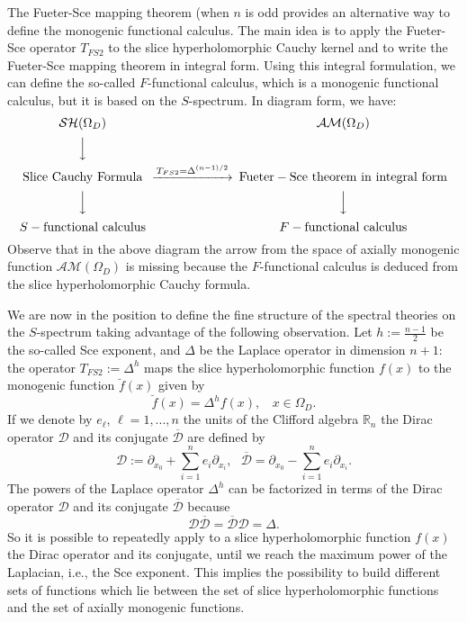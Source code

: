\documentclass[reqno,11pt]{amsart}
\numberwithin{equation}{section}
\theoremstyle{definition}
\begin{document}
\medskip
The Fueter-Sce mapping theorem (when $n$ is odd provides an
alternative way to define the monogenic functional calculus.
The main idea is to apply the Fueter-Sce operator $T_{FS2}$ to the slice hyperholomorphic Cauchy kernel and to write the Fueter-Sce mapping theorem in integral form. Using this integral formulation, we can define the so-called $F$-functional calculus, which
 is a monogenic functional calculus, but it is based on the $S$-spectrum.
In diagram form, we have:
\begin{equation*}
\begin{CD}
{\mathcal{SH}(\Omega_D)} @.  {\mathcal{AM}(\Omega_D)} \\   @V  VV
  @.
\\
{{\rm  Slice\ Cauchy \ Formula}}  @> T_{FS2}=\Delta^{(n-1)/2}>> {{\rm Fueter-Sce\ theorem \ in \  integral\  form}}
\\
@V VV    @V VV
\\
{S-{\rm  functional \ calculus}} @. F-{{\rm functional \ calculus}}
\end{CD}
\end{equation*}
 Observe that in the above diagram the arrow from the space of axially monogenic function $\mathcal{AM}(\Omega_D)$ is missing because the $F$-functional calculus is deduced from the slice hyperholomorphic Cauchy formula.


\medskip
We are now in the position to define the fine structure of the spectral theories on the $S$-spectrum
taking advantage of the following observation.
Let $h:=\frac{n-1}{2}$ be the so-called Sce exponent, and $\Delta$ be the Laplace operator in dimension $n+1$: the operator $T_{FS2}:= \Delta^{h}$  maps the slice hyperholomorphic function $f(x)$ to the monogenic function $\breve{f}(x)$ given by
$$
\breve{f}(x)= \Delta^hf(x),\ \ \ \ x\in \Omega_D.
$$
If we denote by $e_\ell$, $\ell=1,...,n$ the units of the Clifford algebra $\mathbb{R}_n$
the Dirac operator $\mathcal{D}$ and its conjugate $\overline{\mathcal{D}}$ are defined by
$$
\mathcal{D} :=\partial_{x_0} +\sum_{i=1}^n e_i
\partial_{x_i}, \ \ \ \overline{\mathcal{D}}=\partial_{x_0} -\sum_{i=1}^n e_i
\partial_{x_i}.
$$
The powers of the Laplace operator $\Delta^h$ can be factorized in terms of the
Dirac operator $ \mathcal{D}$ and its conjugate
 $\mathcal{\overline{D}}$ because
   $$
   \mathcal{D}\mathcal{\overline{D}}=\mathcal{\overline{D}}\mathcal{D}=\Delta.
   $$
   So it is possible to repeatedly apply to a slice hyperholomorphic function $f(x)$
   the Dirac operator and its conjugate, until we reach the maximum power of the Laplacian, i.e., the Sce exponent.
 This implies the possibility to build different sets of functions which lie between the set of slice hyperholomorphic functions and the set of axially monogenic functions.
\end{document}
